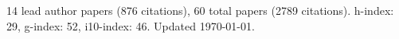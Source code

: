 14 lead author papers (876 citations),
60 total papers (2789 citations).\newline
h-index: 29, g-index: 52, i10-index: 46. Updated \today.